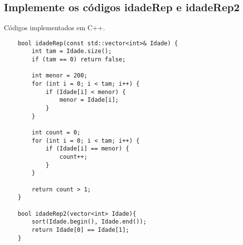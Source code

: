 \subsection{Implemente os códigos idadeRep e idadeRep2}

Códigos implementados em C++.
\begin{verbatim}
    bool idadeRep(const std::vector<int>& Idade) {
        int tam = Idade.size();
        if (tam == 0) return false; 
    
        int menor = 200;  
        for (int i = 0; i < tam; i++) {
            if (Idade[i] < menor) {
                menor = Idade[i];
            }
        }
    
        int count = 0;
        for (int i = 0; i < tam; i++) {
            if (Idade[i] == menor) {
                count++;  
            }
        }
    
        return count > 1; 
    }
    
    bool idadeRep2(vector<int> Idade){
        sort(Idade.begin(), Idade.end());
        return Idade[0] == Idade[1];
    }

\end{verbatim}